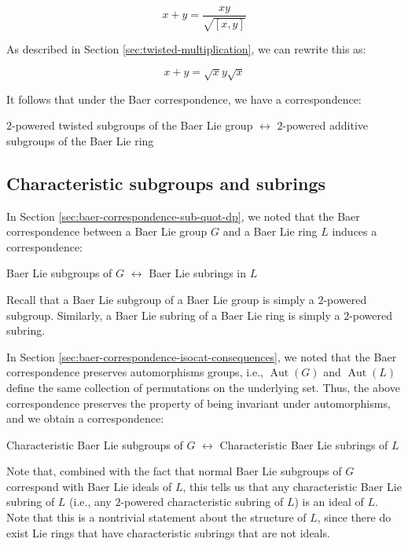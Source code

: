 \documentclass{ucetd}
\begin{document}
$$x + y = \frac{xy}{\sqrt{[x,y]}}$$

As described in Section \ref{sec:twisted-multiplication}, we can
rewrite this as:

$$x + y = \sqrt{x} y \sqrt{x}$$

It follows that under the Baer correspondence, we have a correspondence:

\begin{center}
  $2$-powered twisted subgroups of the Baer Lie group $\leftrightarrow$ $2$-powered additive subgroups of the Baer Lie ring
\end{center}

\subsection{Characteristic subgroups and subrings}

In Section \ref{sec:baer-correspondence-sub-quot-dp}, we noted that
the Baer correspondence between a Baer Lie group $G$ and a Baer Lie
ring $L$ induces a correspondence:

\begin{center}
  Baer Lie subgroups of $G$ $\leftrightarrow$ Baer Lie subrings in $L$
\end{center}

Recall that a Baer Lie subgroup of a Baer Lie group is simply a
$2$-powered subgroup. Similarly, a Baer Lie subring of a Baer Lie ring
is simply a $2$-powered subring.

In Section \ref{sec:baer-correspondence-isocat-consequences}, we noted
that the Baer correspondence preserves automorphisms groups, i.e.,
$\operatorname{Aut}(G)$ and $\operatorname{Aut}(L)$ define the same
collection of permutations on the underlying set. Thus, the above
correspondence preserves the property of being invariant under
automorphisms, and we obtain a correspondence:

\begin{center}
  Characteristic Baer Lie subgroups of $G$ $\leftrightarrow$
  Characteristic Baer Lie subrings of $L$
\end{center}

Note that, combined with the fact that normal Baer Lie subgroups of
$G$ correspond with Baer Lie ideals of $L$, this tells us that any
characteristic Baer Lie subring of $L$ (i.e., any $2$-powered
characteristic subring of $L$) is an ideal of $L$. Note that this is a
nontrivial statement about the structure of $L$, since there do exist
Lie rings that have characteristic subrings that are not ideals.
\end{document}
